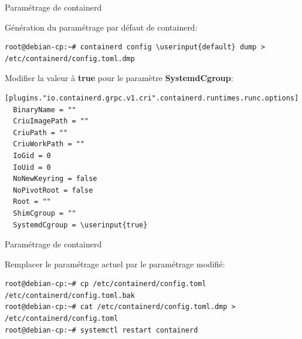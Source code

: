 
\begin{frame}[fragile]{Paramétrage de containerd}

Génération du paramétrage par défaut de containerd:

\begin{tiny}
\begin{Verbatim}[commandchars=\\\{\}]
root@debian-cp:~# containerd config \userinput{default} dump > /etc/containerd/config.toml.dmp
\end{Verbatim}
\end{tiny}

Modifier la valeur à \textbf{true} pour le paramètre \textbf{SystemdCgroup}:

\begin{tiny}
\begin{Verbatim}[commandchars=\\\{\}]
[plugins."io.containerd.grpc.v1.cri".containerd.runtimes.runc.options]
  BinaryName = ""
  CriuImagePath = ""
  CriuPath = ""
  CriuWorkPath = ""
  IoGid = 0
  IoUid = 0
  NoNewKeyring = false
  NoPivotRoot = false
  Root = ""
  ShimCgroup = ""
  SystemdCgroup = \userinput{true}
\end{Verbatim}
\end{tiny}

\end{frame}


\begin{frame}[fragile]{Paramétrage de containerd}

Remplacer le paramétrage actuel par le paramétrage modifié:

\begin{tiny}
\begin{Verbatim}[commandchars=\\\{\}]
root@debian-cp:~# cp /etc/containerd/config.toml /etc/containerd/config.toml.bak
root@debian-cp:~# cat /etc/containerd/config.toml.dmp > /etc/containerd/config.toml
root@debian-cp:~# systemctl restart containerd
\end{Verbatim}
\end{tiny}

\end{frame}


